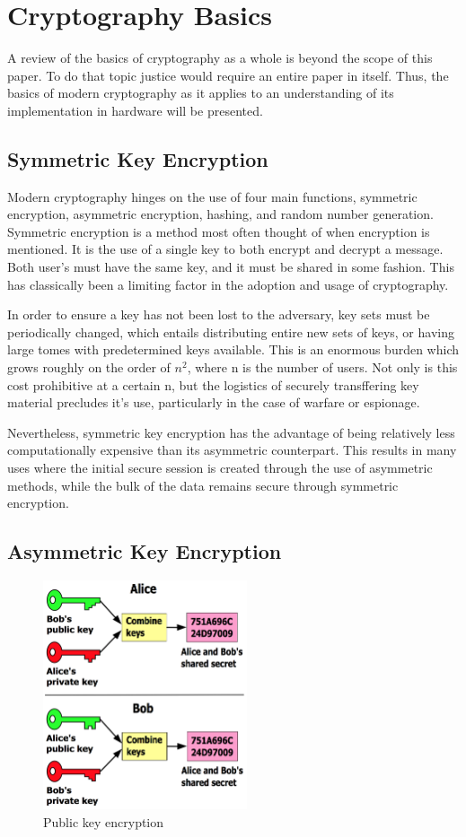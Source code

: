 \documentclass[journal]{IEEEtran}
\begin{document}
\section{Cryptography Basics}

A review of the basics of cryptography as a whole is beyond the scope of this paper.  To do that topic justice would require an entire paper in itself.  Thus, the basics of modern cryptography as it applies to an understanding of its implementation in hardware will be presented.

\subsection{Symmetric Key Encryption}

Modern cryptography hinges on the use of four main functions, symmetric encryption, asymmetric encryption, hashing, and random number generation.  Symmetric encryption is a method most often thought of when encryption is mentioned.  It is the use of a single key to both encrypt and decrypt a message.  Both user's must have the same key, and it must be shared in some fashion.  This has classically been a limiting factor in the adoption and usage of cryptography.  

In order to ensure a key has not been lost to the adversary, key sets must be periodically changed, which entails distributing entire new sets of keys, or having large tomes with predetermined keys available.  This is an enormous burden which grows roughly on the order of $n^2$, where n is the number of users.  Not only is this cost prohibitive at a certain n, but the logistics of securely transffering key material precludes it's use, particularly in the case of warfare or espionage.

Nevertheless, symmetric key encryption has the advantage of being relatively less computationally expensive than its asymmetric counterpart.  This results in many uses where the initial secure session is created through the use of asymmetric methods, while the bulk of the data remains secure through symmetric encryption.

\subsection{Asymmetric Key Encryption}

\begin{figure}[htbp]
	\centering
	\includegraphics[width=6cm,keepaspectratio]{img/crypto1.png}
	\caption{Public key encryption \cite{KeyFigure} }
	\label{pubenc}
\end{figure}
\end{document}
